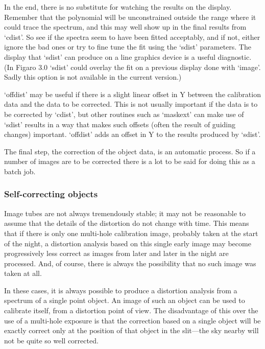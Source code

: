 \documentclass[11pt,twoside]{article}
\newcommand{\latorhtm}[2]{#1}
\newcommand{\latorhtm}[2]{#2}
\begin{document}
   In the end, there is no substitute for watching the results on the
   display. Remember that the polynomial will be unconstrained outside
   the range where it could trace the spectrum, and this may well show
   up in the final results from `cdist'.  So see if the spectra seem to
   have been fitted acceptably, and if not, either ignore the bad ones
   or try to fine tune the fit using the `sdist' parameters.  The
   display that `sdist' can produce on a line graphics device is a
   useful diagnostic. (In Figaro 3.0 `sdist' could overlay the fit on a
   previous display done with `image'. Sadly this option is not
   available in the current version.)

   `offdist' may be useful if there is a slight linear offset in Y
   between the calibration data and the data to be corrected.  This is
   not usually important if the data is to be corrected by `cdist', but
   other routines such as `maskext' can make use of `sdist' results in a
   way that makes such offsets (often the result of guiding changes)
   important.  `offdist' adds an offset in Y to the results produced by
   `sdist'.

   The final step, the correction of the object data, is an automatic
   process.  So if a number of images are to be corrected there is a lot
   to be said for doing this as a batch job.


\subsubsection{\label{techno7self}Self-correcting objects}

   Image tubes are not always tremendously stable; it may not be
   reasonable to assume that the details of the distortion do not change
   with time.  This means that if there is only one multi-hole
   calibration image, probably taken at the start of the night, a
   distortion analysis based on this single early image may become
   progressively less correct as images from later and later in the
   night are processed.  And, of course, there is always the possibility
   that no such image was taken at all.

   In these cases, it is always possible to produce a distortion
   analysis from a spectrum of a single point object.  An image of such
   an object can be used to calibrate itself, from a distortion point of
   view.  The disadvantage of this over the use of a multi-hole exposure
   is that the correction based on a single object will be exactly
   correct only at the position of that object in the
   slit\latorhtm{---}{-}the sky
   nearby will not be quite so well corrected.
\end{document}
